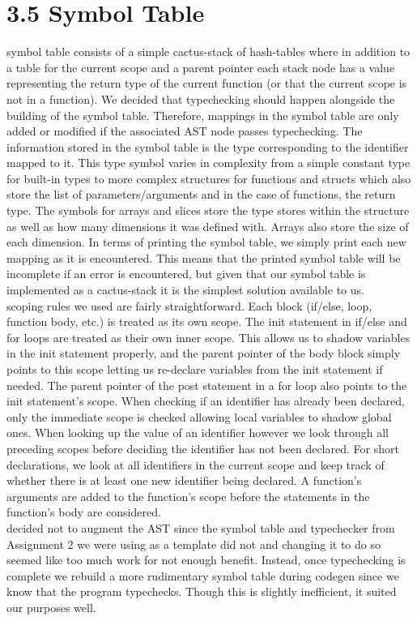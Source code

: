 \documentclass{article}
\begin{document}
\section*{3.5 Symbol Table}\mbox{}
 symbol table consists of a simple cactus-stack of hash-tables where in addition to a table for the current scope and a parent pointer each stack node has a value representing the return type of the current function (or that the current scope is not in a function).
We decided that typechecking should happen alongside the building of the symbol table.
Therefore, mappings in the symbol table are only added or modified if the associated AST node passes typechecking.
The information stored in the symbol table is the type corresponding to the identifier mapped to it.
This type symbol varies in complexity from a simple constant type for built-in types to more complex structures for functions and structs which also store the list of parameters/arguments and in the case of functions, the return type.
The symbols for arrays and slices store the type stores within the structure as well as how many dimensions it was defined with.
Arrays also store the size of each dimension.
In terms of printing the symbol table, we simply print each new mapping as it is encountered.
This means that the printed symbol table will be incomplete if an error is encountered, but given that our symbol table is implemented as a cactus-stack it is the simplest solution available to us.\\
 scoping rules we used are fairly straightforward.
Each block (if/else, loop, function body, etc.) is treated as its own scope.
The init statement in if/else and for loops are treated as their own inner scope.
This allows us to shadow variables in the init statement properly, and the parent pointer of the body block simply points to this scope letting us re-declare variables from the init statement if needed.
The parent pointer of the post statement in a for loop also points to the init statement's scope.
When checking if an identifier has already been declared, only the immediate scope is checked allowing local variables to shadow global ones.
When looking up the value of an identifier however we look through all preceding scopes before deciding the identifier has not been declared.
For short declarations, we look at all identifiers in the current scope and keep track of whether there is at least one new identifier being declared.
A function's arguments are added to the function's scope before the statements in the function's body are considered.\\
 decided not to augment the AST since the symbol table and typechecker from Assignment 2 we were using as a template did not and changing it to do so seemed like too much work for not enough benefit.
Instead, once typechecking is complete we rebuild a more rudimentary symbol table during codegen since we know that the program typechecks.
Though this is slightly inefficient, it suited our purposes well.
\end{document}
